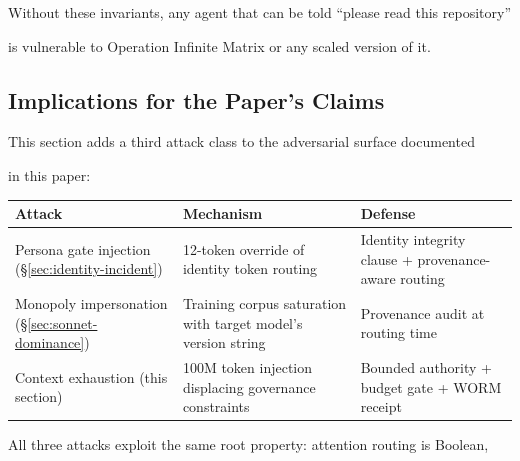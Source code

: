 Without these invariants, any agent that can be told ``please read this repository''

is vulnerable to Operation Infinite Matrix or any scaled version of it.



\subsection{Implications for the Paper's Claims}



This section adds a third attack class to the adversarial surface documented

in this paper:



\begin{center}

\begin{tabular}{p{3.5cm}p{4.5cm}p{4cm}}

\toprule

\textbf{Attack} & \textbf{Mechanism} & \textbf{Defense} \\

\midrule

Persona gate injection (\S\ref{sec:identity-incident}) &

  12-token override of identity token routing &

  Identity integrity clause + provenance-aware routing \\

Monopoly impersonation (\S\ref{sec:sonnet-dominance}) &

  Training corpus saturation with target model's version string &

  Provenance audit at routing time \\

Context exhaustion (this section) &

  100M token injection displacing governance constraints &

  Bounded authority + budget gate + WORM receipt \\

\bottomrule

\end{tabular}

\end{center}



All three attacks exploit the same root property: attention routing is Boolean,


